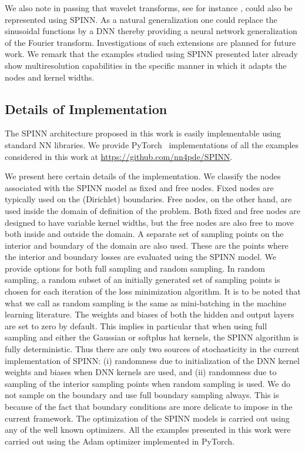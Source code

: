 \documentclass[12pt]{article}
\newcommand{\rb}[1]{#1}
\newcommand{\new}[1]{#1}
\begin{document}
We also note in passing that wavelet transforms, see for instance \cite{WA94}, could also be represented using SPINN. As a natural generalization one could replace the sinusoidal functions by a DNN thereby providing a neural network generalization of the Fourier transform. Investigations of such extensions are planned for future work. \new{We remark that the examples studied using SPINN presented later already show multiresolution capabilities in the specific manner in which it adapts the nodes and kernel widths.}

\subsection{Details of Implementation}
The SPINN architecture proposed in this work is easily implementable using standard NN libraries. We provide PyTorch~\cite{pytorch} implementations of all the examples considered in this work at \url{https://github.com/nn4pde/SPINN}.

We present here certain details of the implementation. We classify the nodes associated with the SPINN model as fixed and free nodes. Fixed nodes are typically used on the (Dirichlet) boundaries. Free nodes, on the other hand, are used inside the domain of definition of the problem. Both fixed and free nodes are designed to have variable kernel widths, but the free nodes are also free to move both inside and outside the domain. A separate set of sampling points on the interior and boundary of the domain are also used. These are the points where the interior and boundary losses are evaluated using the SPINN model. We provide options for both full sampling and random sampling. In random sampling, a random subset of an initially generated set of sampling points is chosen for each iteration of the loss minimization algorithm. \rb{It is to be noted that what we call as random sampling is the same as mini-batching in the machine learning literature. The weights and biases of both the hidden and output layers are set to zero by default.} This implies in particular that when using full sampling and either the Gaussian or softplus hat kernels, the SPINN algorithm is fully deterministic. Thus there are only two sources of stochasticity in the current implementation of SPINN: (i) randomness due to initialization of the DNN kernel weights and biases when DNN kernels are used, and (ii) randomness due to sampling of the interior sampling points when random sampling is used. We do not sample on the boundary and use full boundary sampling always. This is because of the fact that boundary conditions are more delicate to impose in the current framework. The optimization of the SPINN models is carried out using any of the well known optimizers. All the examples presented in this work were carried out using the Adam optimizer \cite{kingma2014} implemented in PyTorch.
\end{document}
